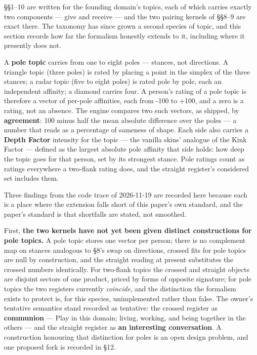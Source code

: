 \S \S 1--10 are written for the founding domain's topics, each of which
carries exactly two components --- give and receive --- and the two
pairing kernels of \S \S 8--9 are exact there. The taxonomy has since grown
a second species of topic, and this section records how far the
formalism honestly extends to it, including where it presently does not.

A \textbf{pole topic} carries from one to eight poles --- stances, not
directions. A triangle topic (three poles) is rated by placing a point
in the simplex of the three stances; a radar topic (five to eight poles)
is rated pole by pole, each an independent affinity; a diamond carries
four. A person's rating of a pole topic is therefore a vector of
per-pole affinities, each from -100 to +100, and a zero is a rating, not
an absence. The engine compares two such vectors, as shipped, by
\textbf{agreement}: 100 minus half the mean absolute difference over the
poles --- a number that reads as a percentage of sameness of shape. Each
side also carries a \textbf{Depth Factor} intensity for the topic ---
the vanilla skins' analogue of the Kink Factor --- defined as the
largest absolute pole affinity that side holds: how deep the topic goes
for that person, set by its strongest stance. Pole ratings count as
ratings everywhere a two-flank rating does, and the straight register's
considered set includes them.

Three findings from the code trace of 2026-11-19 are recorded here
because each is a place where the extension falls short of this paper's
own standard, and the paper's standard is that shortfalls are stated,
not smoothed.

First, \textbf{the two kernels have not yet been given distinct
constructions for pole topics.} A pole topic stores one vector per
person; there is no complement map on stances analogous to \S 8's swap on
directions, crossed fits for pole topics are null by construction, and
the straight reading at present substitutes the crossed numbers
identically. For two-flank topics the crossed and straight objects are
disjoint sectors of one product, priced by forms of opposite signature;
for pole topics the two registers currently \emph{coincide}, and the
distinction the formalism exists to protect is, for this species,
unimplemented rather than false. The owner's tentative semantics stand
recorded as tentative: the crossed register as \textbf{communion} ---
Play in this domain; living, working, and being together in the others
--- and the straight register as \textbf{an interesting conversation}. A
construction honouring that distinction for poles is an open design
problem, and one proposed fork is recorded in \S 12.

